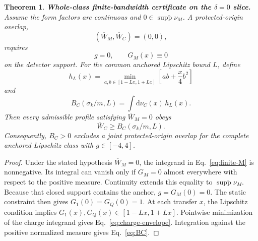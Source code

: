 \documentclass[12pt]{iopjournal}
\newcommand{\dd}{\mathrm d}
\newtheorem{theorem}{Theorem}[section]
\theoremstyle{definition}
\theoremstyle{remark}
\begin{document}
\begin{theorem}
\textbf{Whole-class finite-bandwidth certificate on the $\delta=0$ slice.}
\label{prop:positivity-envelope}
Assume the form factors are continuous and $0\in\overline{\operatorname{supp}\nu_M}$. A protected-origin overlap,
\begin{equation}
(\overline W_M,\overline W_C)=(0,0),
\end{equation}
requires
\begin{equation}
g=0,
\qquad
G_M(x)\equiv0
\label{eq:magnetic-zero-reduction}
\end{equation}
on the detector support. For the common anchored Lipschitz bound $L$, define
\begin{equation}
h_L(x)=
\min_{a,b\in[1-Lx,1+Lx]}
\left[ab+\frac{x}{4}b^2\right]
\label{eq:charge-envelope}
\end{equation}
and
\begin{equation}
B_C(\sigma_k/m,L)=\int\dd\nu_C(x)\,h_L(x).
\label{eq:BC}
\end{equation}
Then every admissible profile satisfying $\overline W_M=0$ obeys
\begin{equation}
\overline W_C\ge B_C(\sigma_k/m,L).
\end{equation}
Consequently, $B_C>0$ excludes a joint protected-origin overlap for the complete anchored Lipschitz class with $g\in[-4,4]$.
\end{theorem}
\begin{proof}
Under the stated hypothesis $\overline W_M=0$, the integrand in Eq.~\eqref{eq:finite-M} is nonnegative. Its integral can vanish only if $G_M=0$ almost everywhere with respect to the positive measure. Continuity extends this equality to $\overline{\operatorname{supp}\nu_M}$. Because that closed support contains the anchor, $g=G_M(0)=0$. The static constraint then gives $G_1(0)=G_Q(0)=1$. At each transfer $x$, the Lipschitz condition implies $G_1(x),G_Q(x)\in[1-Lx,1+Lx]$. Pointwise minimization of the charge integrand gives Eq.~\eqref{eq:charge-envelope}. Integration against the positive normalized measure gives Eq.~\eqref{eq:BC}.
\end{proof}
\end{document}
